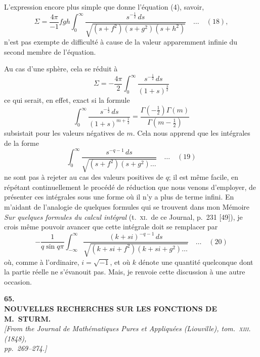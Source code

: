 \documentclass[11pt]{article}
\begin{document}
\medskip
L'expression encore plus simple que donne l'\'equation (4), savoir,
\[
\Sigma = \frac{4\pi}{-1}fgh\int_{0}^{\infty}\frac{s^{-\tfrac{1}{2}}\,ds}{\sqrt{(s + f^{2})(s + g^{2})(s + h^{2})}}\quad\ldots\quad (18),
\]
n'est pas exempte de difficult\'e \`a cause de la valeur apparemment infinie du second
membre de l'\'equation.

\medskip
Au cas d'une sph\`ere, cela se r\'eduit \`a
\[
\Sigma = -\frac{4\pi}{2}\int_{0}^{\infty}\frac{s^{-\tfrac{1}{2}}\,ds}{(1 + s)^{\tfrac{3}{2}}}
\]
ce qui serait, en effet, exact si la formule
\[
\int_{0}^{\infty}\frac{s^{-\tfrac{1}{2}}\,ds}{(1 + s)^{m + \tfrac{1}{2}}} = \frac{\Gamma(-\tfrac{1}{2})\Gamma(m)}{\Gamma(m - \tfrac{1}{2})}
\]
subsistait pour les valeurs n\'egatives de $m$. Cela nous apprend que les int\'egrales de la
forme
\[
\int_{0}^{\infty}\frac{s^{-q - 1}\,ds}{\sqrt{(s + f^{2})(s + g^{2})\ldots}}\quad\ldots\quad (19)
\]
ne sont pas \`a rejeter au cas des valeurs positives de $q$; il est m\^eme facile, en r\'ep\'etant
continuellement le proc\'ed\'e de r\'eduction que nous venons d'employer, de pr\'esenter ces
int\'egrales sous une forme o\`u il n'y a plus de terme infini. En m'aidant de l'analogie
de quelques formules qui se trouvent dans mon M\'emoire \textit{Sur quelques formules du
calcul int\'egral} (t.~\textsc{xi}.\ de ce Journal, p.~231 [49]), je crois m\^eme pouvoir avancer que
cette int\'egrale doit se remplacer par
\[
-\frac{1}{q\sin q\pi}\int_{-\infty}^{\infty}\frac{(k + si)^{-q - 1}\,ds}{\sqrt{(k + si + f^{2})(k + si + g^{2})\ldots}}\quad\ldots\quad (20)
\]
o\`u, comme \`a l'ordinaire, $i = \sqrt{-1}$, et o\`u $k$ d\'enote une quantit\'e quelconque dont la
partie r\'eelle ne s'\'evanouit pas. Mais, je renvoie cette discussion \`a une autre occasion.

\bigskip

\begin{center}
\textbf{\large 65.}\\[0.7em]
\textbf{\large NOUVELLES RECHERCHES SUR LES FONCTIONS DE M.~STURM.}\\[0.5em]
\textit{[From the Journal de Math\'ematiques Pures et Appliqu\'ees (Liouville), tom.~\textsc{xiii}. (1848),\\
pp.~269--274.]}
\end{center}
\end{document}
